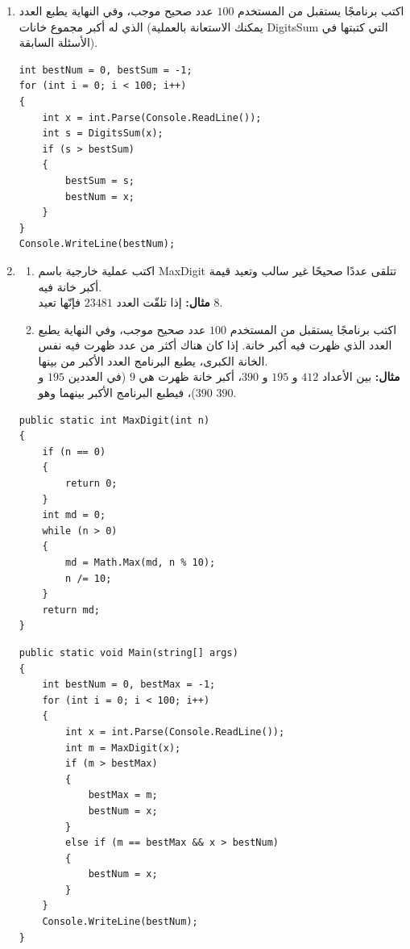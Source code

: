 \documentclass[14pt]{extarticle}
\begin{document}
\begin{enumerate}[itemsep=2em]
\item اكتب برنامجًا يستقبل من المستخدم $100$ عدد صحيح موجب، وفي النهاية يطبع العدد الذي له أكبر مجموع خانات (يمكنك الاستعانة بالعملية \textenglish{DigitsSum} التي كتبتها في الأسئلة السابقة).
\ifwithsols
\begin{boxSolution}
\begin{english}
\begin{verbatim}
int bestNum = 0, bestSum = -1;
for (int i = 0; i < 100; i++)
{
    int x = int.Parse(Console.ReadLine());
    int s = DigitsSum(x);
    if (s > bestSum)
    {
        bestSum = s;
        bestNum = x;
    }
}
Console.WriteLine(bestNum);
\end{verbatim}
\end{english}
\end{boxSolution}
\fi
\filbreak

\item
\begin{enumerate}
    \item اكتب عملية خارجية باسم \textenglish{MaxDigit} تتلقى عددًا صحيحًا غير سالب وتعيد قيمة أكبر خانة فيه. \\
    \textbf{مثال:} إذا تلقّت العدد $23481$ فإنّها تعيد $8$.
    \item اكتب برنامجًا يستقبل من المستخدم $100$ عدد صحيح موجب، وفي النهاية يطبع العدد الذي ظهرت فيه أكبر خانة. إذا كان هناك أكثر من عدد ظهرت فيه نفس الخانة الكبرى، يطبع البرنامج العدد الأكبر من بينها. \\
    \textbf{مثال:} بين الأعداد $412$ و $195$ و $390$، أكبر خانة ظهرت هي $9$ (في العددين $195$ و $390$)، فيطبع البرنامج الأكبر بينهما وهو $390$.
\end{enumerate}
\ifwithsols
\begin{boxSolution}[فرع أ]
\begin{english}
\begin{verbatim}
public static int MaxDigit(int n)
{
    if (n == 0)
    {
        return 0;
    }
    int md = 0;
    while (n > 0)
    {
        md = Math.Max(md, n % 10);
        n /= 10;
    }
    return md;
}
\end{verbatim}
\end{english}
\end{boxSolution}

\filbreak

\begin{boxSolution}[فرع ب]
\begin{english}
\begin{verbatim}
public static void Main(string[] args)
{
    int bestNum = 0, bestMax = -1;
    for (int i = 0; i < 100; i++)
    {
        int x = int.Parse(Console.ReadLine());
        int m = MaxDigit(x);
        if (m > bestMax)
        {
            bestMax = m;
            bestNum = x;
        }
        else if (m == bestMax && x > bestNum)
        {
            bestNum = x;
        }
    }
    Console.WriteLine(bestNum);
}
\end{verbatim}
\end{english}
\end{boxSolution}
\fi
\filbreak


\end{enumerate}
\end{document}
